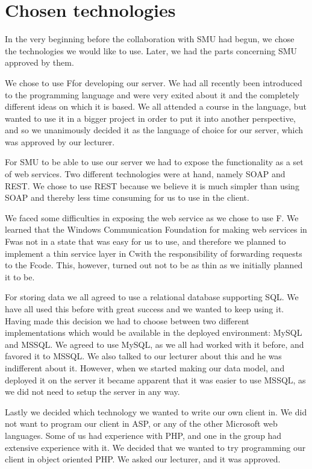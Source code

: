 \section{Chosen technologies}
In the very beginning before the collaboration with SMU had begun, we chose the technologies we would like to use. Later, we had the parts concerning SMU approved by them.

We chose to use F\Sh for developing our server. We had all recently been introduced to the programming language and were very exited about it and the completely different ideas on which it is based.
We all attended a course in the language, but wanted to use it in a bigger project in order to put it into another perspective, and so we unanimously decided it as the language of choice for our server, which was approved by our lecturer.

For SMU to be able to use our server we had to expose the functionality as a set of web services. Two different technologies were at hand, namely SOAP and REST.
We chose to use REST because we believe it is much simpler than using SOAP and thereby less time consuming for us to use in the client.

We faced some difficulties in exposing the web service as we chose to use F\Sh.
We learned that the Windows Communication Foundation for making web services in F\Sh was not in a state that was easy for us to use, and therefore we planned to implement a thin service layer in C\Sh with the responsibility of forwarding requests to the F\Sh code. This, however, turned out not to be as thin as we initially planned it to be.

For storing data we all agreed to use a relational database supporting SQL. We have all used this before with great success and we wanted to keep using it.
Having made this decision we had to choose between two different implementations which would  be available in the deployed environment: MySQL and MSSQL. We agreed to use MySQL, as we all had worked with it before, and favored it to MSSQL. We also talked to our lecturer about this and he was indifferent about it. However, when we started making our data model, and deployed it on the server it became apparent that it was easier to use MSSQL, as we did not need to setup the server in any way.

Lastly we decided which technology we wanted to write our own client in. We did not want to program our client in ASP, or any of the other Microsoft web languages. Some of us had experience with PHP, and one in the group had extensive experience with it.  We decided that we wanted to try programming our client in object oriented PHP. We asked our lecturer, and it was approved.
\newpage